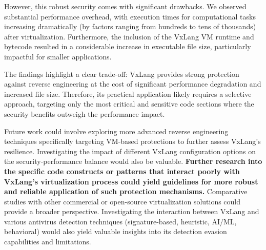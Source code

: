 However, this robust security comes with significant drawbacks. We observed substantial performance overhead, with execution times for computational tasks increasing dramatically (by factors ranging from hundreds to tens of thousands) after virtualization. Furthermore, the inclusion of the VxLang VM runtime and bytecode resulted in a considerable increase in executable file size, particularly impactful for smaller applications.

The findings highlight a clear trade-off: VxLang provides strong protection against reverse engineering at the cost of significant performance degradation and increased file size. Therefore, its practical application likely requires a selective approach, targeting only the most critical and sensitive code sections where the security benefits outweigh the performance impact.

Future work could involve exploring more advanced reverse engineering techniques specifically targeting VM-based protections to further assess VxLang's resilience. Investigating the impact of different VxLang configuration options on the security-performance balance would also be valuable. \textbf{Further research into the specific code constructs or patterns that interact poorly with VxLang's virtualization process could yield guidelines for more robust and reliable application of such protection mechanisms.} Comparative studies with other commercial or open-source virtualization solutions could provide a broader perspective. Investigating the interaction between VxLang and various antivirus detection techniques (signature-based, heuristic, AI/ML, behavioral) would also yield valuable insights into its detection evasion capabilities and limitations.
